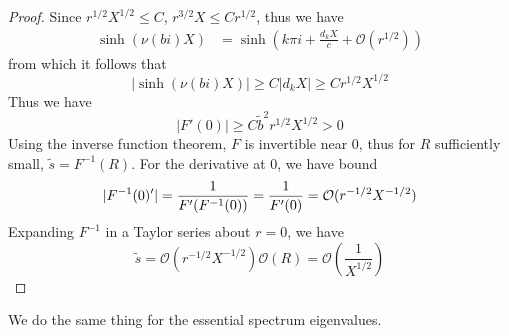 \documentclass[thesis.tex]{subfiles}
\begin{document}
\begin{lemma}
\begin{proof}
Since $r^{1/2}X^{1/2} \leq C$, $r^{3/2}X \leq C r^{1/2}$, thus we have
\begin{align*} 
\sinh( \nu(bi)X) &= \sinh\left( k \pi i + \frac{d_k X}{c} + \mathcal{O}(r^{1/2}) \right)
\end{align*}
from which it follows that
\[
|\sinh( \nu(bi)X)| \geq C |d_k X| \geq C r^{1/2}X^{1/2}
\]
Thus we have
\[
|F'(0)| \geq C \tilde{b}^2 r^{1/2}X^{1/2} > 0
\]
Using the inverse function theorem, $F$ is invertible near 0, thus for $R$ sufficiently small, $\tilde{s} = F^{-1}(R)$. For the derivative at 0, we have bound
\[
|F^{-1}(0)'| = \frac{1}{F'(F^{-1}(0))} \\
= \frac{1}{F'(0)} = \mathcal{O}(r^{-1/2}X^{-1/2})
\]
Expanding $F^{-1}$ in a Taylor series about $r = 0$, we have
\[
\tilde{s} = \mathcal{O}(r^{-1/2}X^{-1/2}) \mathcal{O}(R) = \mathcal{O}\left( \frac{1}{X^{1/2}}\right)
\]
\end{proof}
\end{lemma}

We do the same thing for the essential spectrum eigenvalues.
\end{document}
